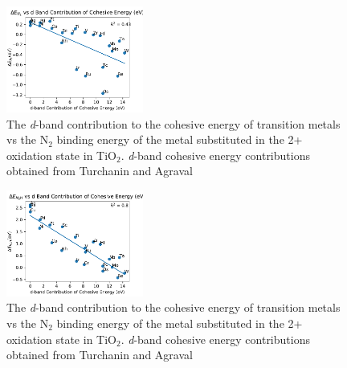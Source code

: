 \begin{figure}
    \centering
    \includegraphics[width=0.4\textwidth]{Images/cohesive_eng_vs_N2.pdf}
    
    \caption{The \textit{d}-band contribution to the cohesive energy of transition metals vs the N$_2$ binding energy of the metal substituted in the 2+ oxidation state in TiO$_2$. \textit{d}-band cohesive energy contributions obtained from Turchanin and Agraval\cite{Turchanin_2008}}
    \label{fig:N2_cohesive}
\end{figure}

\begin{figure}
    \centering
    \includegraphics[width=0.4\textwidth]{Images/cohesive_eng_vs_NH2.pdf}
    
    \caption{The \textit{d}-band contribution to the cohesive energy of transition metals vs the N$_2$ binding energy of the metal substituted in the 2+ oxidation state in TiO$_2$. \textit{d}-band cohesive energy contributions obtained from Turchanin and Agraval\cite{Turchanin_2008}}
    \label{fig:N2_cohesive}
\end{figure}



